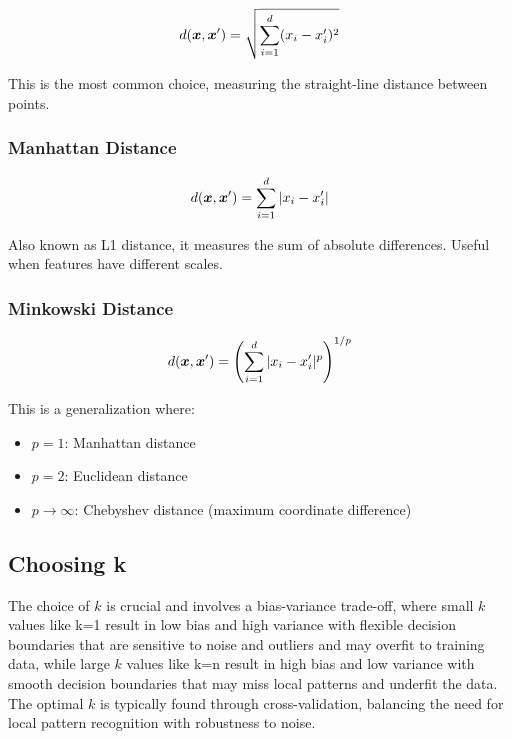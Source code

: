 \begin{equation}
d(\boldsymbol{x}, \boldsymbol{x}') = \sqrt{\sum_{i=1}^{d} (x_i - x_i')^2}
\end{equation}

This is the most common choice, measuring the straight-line distance between points.

\subsubsection{Manhattan Distance}

\begin{equation}
d(\boldsymbol{x}, \boldsymbol{x}') = \sum_{i=1}^{d} |x_i - x_i'|
\end{equation}

Also known as L1 distance, it measures the sum of absolute differences. Useful when features have different scales.

\subsubsection{Minkowski Distance}

\begin{equation}
d(\boldsymbol{x}, \boldsymbol{x}') = \left(\sum_{i=1}^{d} |x_i - x_i'|^p\right)^{1/p}
\end{equation}

This is a generalization where:
\begin{itemize}
    \item $p = 1$: Manhattan distance
    \item $p = 2$: Euclidean distance
    \item $p \to \infty$: Chebyshev distance (maximum coordinate difference)
\end{itemize}

\subsection{Choosing k}

The choice of $k$ is crucial and involves a bias-variance trade-off, where small $k$ values like k=1 result in low bias and high variance with flexible decision boundaries that are sensitive to noise and outliers and may overfit to training data, while large $k$ values like k=n result in high bias and low variance with smooth decision boundaries that may miss local patterns and underfit the data. The optimal $k$ is typically found through cross-validation, balancing the need for local pattern recognition with robustness to noise.

